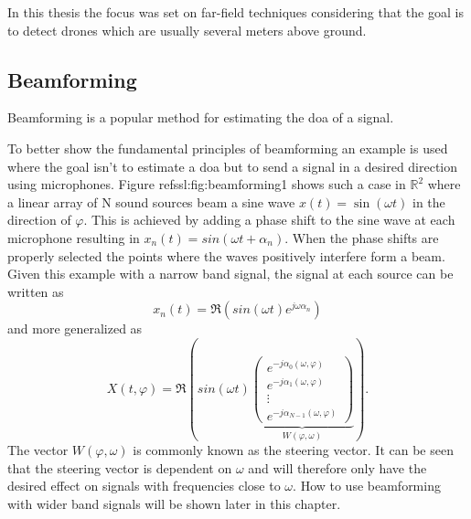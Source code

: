 In this thesis the focus was set on far-field techniques considering that the
goal is to detect drones which are usually several meters above ground.

\subsection{Beamforming}
Beamforming is a popular method for estimating the \acrshort{doa} of a signal.

To better show the fundamental principles of beamforming an example is used
where the goal isn't to estimate a \acrshort{doa} but to send a signal
in a desired direction using microphones.
Figure ref{ssl:fig:beamforming1} shows such a case in $\mathbb{R}^2$
where a linear array of N sound sources beam a sine wave $x(t) = \sin(\omega t)$ 
in the direction of $\varphi$.
This is achieved by adding a phase shift to the sine wave
at each microphone resulting in $x_n(t) = sin(\omega t + \alpha_n)$.
When the phase shifts are properly selected the points where the waves positively
interfere form a beam.
Given this example with a narrow band signal, the signal at each source
can be written as
\begin{equation}
	x_n(t) = \Re(sin(\omega t) e^{j\omega \alpha_n})
\end{equation}
and more generalized as 
\begin{equation}
  \label{ssl:eq:beamSteerOut}
  X(t, \varphi) = 
  \Re\left(
    sin(\omega t)
    \underbrace{
      \begin{pmatrix} 
        e^{-j\alpha_0(\omega, \varphi)} \\ 
        e^{-j\alpha_1(\omega, \varphi)} \\
        \vdots \\ 
        e^{-j\alpha_{N-1}(\omega, \varphi)} 
      \end{pmatrix}}_{W(\varphi, \omega)}
  \right).
\end{equation}
The vector $W(\varphi, \omega)$ is commonly known as the steering vector.
It can be seen that the steering vector is dependent on $\omega$ and 
will therefore only have the desired effect on signals with frequencies 
close to $\omega$.
How to use beamforming with wider band signals will be shown later in this chapter.
